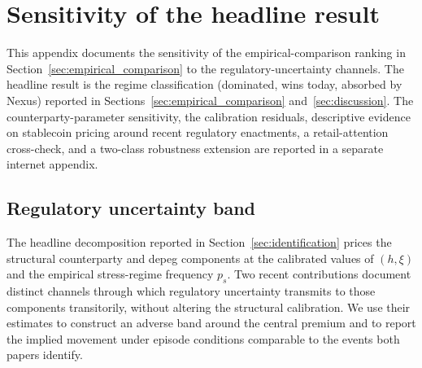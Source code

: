 \section{Sensitivity of the headline result}\label{app:sensitivity}

This appendix documents the sensitivity of the empirical-comparison ranking in Section~\ref{sec:empirical_comparison} to the regulatory-uncertainty channels. The headline result is the regime classification (dominated, wins today, absorbed by Nexus) reported in Sections~\ref{sec:empirical_comparison} and~\ref{sec:discussion}. The counterparty-parameter sensitivity, the calibration residuals, descriptive evidence on stablecoin pricing around recent regulatory enactments, a retail-attention cross-check, and a two-class robustness extension are reported in a separate internet appendix.

\subsection{Regulatory uncertainty band}\label{sub:regulatory_uncertainty_band}

The headline decomposition reported in Section~\ref{sec:identification} prices the structural counterparty and depeg components at the calibrated values of $(h, \xi)$ and the empirical stress-regime frequency $p_s$. Two recent contributions document distinct channels through which regulatory uncertainty transmits to those components transitorily, without altering the structural calibration. We use their estimates to construct an adverse band around the central premium and to report the implied movement under episode conditions comparable to the events both papers identify.

